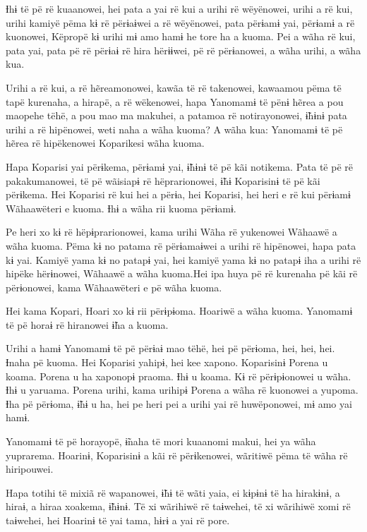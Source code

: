  

 

Ɨhɨ të pë rë kuaanowei, hei pata a yai rë kui a urihi rë wëyënowei,
urihi a rë kui, urihi kamiyë pëma kɨ rë përɨaɨwei a rë wëyënowei, pata
përɨamɨ yai, përɨamɨ a rë kuonowei, Këpropë kɨ urihi mɨ amo hamɨ he tore
ha a kuoma. Pei a wãha rë kui, pata yai, pata pë rë përɨaɨ rë hira
hërɨɨwei, pë rë përɨanowei, a wãha urihi, a wãha kua. 

Urihi a rë kui, a rë hẽreamonowei, kawãa të rë takenowei, kawaamou pëma
të tapë kurenaha, a hirapë, a rë wëkenowei, hapa Yanomamɨ të pënɨ hẽrea
a pou maopehe tëhë, a pou mao ma makuhei, a patamoa rë notirayonowei,
ɨ̃hɨnɨ pata urihi a rë hipënowei, weti naha a wãha kuoma? A wãha kua:
Yanomamɨ të pë hẽrea rë hipëkenowei Koparikesi wãha kuoma. 

Hapa Koparisi yai përɨkema, përɨamɨ yai, ɨ̃hɨnɨ të pë kãi notikema. Pata
të pë rë pakakumanowei, të pë wãisiapɨ rë hëprarionowei, ɨ̃hɨ Koparisinɨ
të pë kãi përɨkema. Hei Koparisi rë kui hei a përɨa, hei Koparisi, hei
heri e rë kui përɨamɨ Wãhaawëteri e kuoma. Ɨhɨ a wãha rii kuoma
përɨamɨ. 

Pe heri xo kɨ rë hëpɨprarionowei, kama urihi Wãha rë yukenowei Wãhaawë a
wãha kuoma. Pëma kɨ no patama rë përɨamaɨwei a urihi rë hipënowei, hapa
pata kɨ yai. Kamiyë yama kɨ no patapɨ yai, hei kamiyë yama kɨ no patapɨ
iha a urihi rë hipëke hërɨnowei, Wãhaawë a wãha kuoma.Hei ipa huya pë rë
kurenaha pë kãi rë përɨonowei, kama Wãhaawëteri e pë wãha kuoma. 

Hei kama Kopari, Hoari xo kɨ rii përɨpɨoma. Hoariwë a wãha kuoma.
Yanomamɨ të pë horaɨ rë hiranowei ɨ̃ha a kuoma. 

Urihi a hamɨ Yanomamɨ të pë përɨaɨ mao tëhë, hei pë përɨoma, hei, hei,
hei. Ɨnaha pë kuoma. Hei Koparisi yahipɨ, hei kee xapono. Koparisinɨ
Porena u koama. Porena u ha xaponopɨ praoma. Ɨhɨ u koama. Kɨ rë
përɨpɨonowei u wãha. Ɨhɨ u yaruama. Porena urihi, kama urihipɨ Porena a
wãha rë kuonowei a yupoma. Ɨha pë përɨoma, ɨ̃hɨ u ha, hei pe heri pei a
urihi yai rë huwëponowei, mɨ amo yai hamɨ. 

Yanomamɨ të pë horayopë, ɨ̃naha të mori kuaanomi makui, hei ya wãha
yuprarema. Hoarinɨ, Koparisinɨ a kãi rë përɨkenowei, wãritiwë pëma të
wãha rë hiripouwei. 

Hapa totihi të mixiã rë wapanowei, ɨ̃hɨ të wãti yaia, ei kɨpɨnɨ të ha
hirakɨnɨ, a hiraɨ, a hiraa xoakema, ɨ̃hɨnɨ. Të xi wãrihiwë rë taɨwehei,
të xi wãrihiwë xomi rë taɨwehei, hei Hoarinɨ të yai tama, hɨrɨ a yai rë
pore. 

